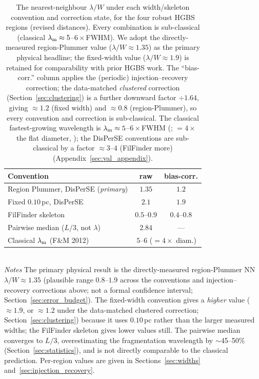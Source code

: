 \documentclass[usenatbib,twoside,twocolumn]{mnras}
\begin{document}
\begin{table}
\caption{The nearest-neighbour $\lambda/W$ under each width/skeleton convention and correction state, for the four robust HGBS regions (revised distances). Every combination is sub-classical (classical $\lambda_{\rm m}\approx5$--$6\times$FWHM). We adopt the directly-measured region-Plummer value ($\lambda/W\approx1.35$) as the primary physical headline; the fixed-width value ($\lambda/W\approx1.9$) is retained for comparability with prior HGBS work. The ``bias-corr.'' column applies the (periodic) injection--recovery correction; the data-matched \emph{clustered} correction (Section~\ref{sec:clustering}) is a further downward factor $\div1.64$, giving $\approx1.2$ (fixed width) and $\approx0.8$ (region-Plummer), so every convention and correction is sub-classical. The classical fastest-growing wavelength is $\lambda_{\rm m}\approx5$--$6\times$FWHM (\citealt{Fischera2012}; $=4\times$ the flat diameter, \citealt{Inutsuka1992}); the DisPerSE conventions are sub-classical by a factor $\approx3$--$4$ (FilFinder more) (Appendix~\ref{sec:val_appendix}).}
\label{tab:headline}
\footnotesize
\setlength{\tabcolsep}{4pt}
\begin{tabular}{p{4.1cm}cc}
\toprule
Convention & raw & bias-corr. \\
\midrule
Region Plummer, DisPerSE (\emph{primary}) & $1.35$ & $1.2$ \\
Fixed $0.10$\,pc, DisPerSE & $2.1$ & $1.9$ \\
FilFinder skeleton & $0.5$--$0.9$ & $0.4$--$0.8$ \\
Pairwise median ($L/3$, not $\lambda$) & $2.84$ & --- \\
\midrule
Classical $\lambda_{\rm m}$ (F\&M 2012) & \multicolumn{2}{c}{$5$--$6$ ($=4\times$ diam.)} \\
\bottomrule
\end{tabular}
\\[2pt]
\footnotesize
\emph{Notes} The primary physical result is the directly-measured region-Plummer NN $\lambda/W\approx1.35$ (plausible range $0.8$--$1.9$ across the conventions and injection--recovery corrections above; not a formal confidence interval; Section~\ref{sec:error_budget}). The fixed-width convention gives a \emph{higher} value ($\approx1.9$, or $\approx1.2$ under the data-matched clustered correction; Section~\ref{sec:clustering}) because it uses $0.10$\,pc rather than the larger measured widths; the FilFinder skeleton gives lower values still. The pairwise median converges to $L/3$, overestimating the fragmentation wavelength by $\sim$45--50\% (Section~\ref{sec:statistics}), and is not directly comparable to the classical prediction. Per-region values are given in Sections~\ref{sec:widths} and~\ref{sec:injection_recovery}.
\end{table}
\end{document}
